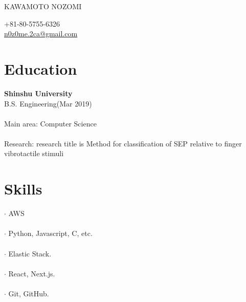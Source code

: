 \documentclass[11pt]{article} %
\begin{document}

\parbox[top][0.12\textheight][c]{\linewidth}{ %
	\vspace{-0.04\textheight} %
	{\color{name}\Huge KAWAMOTO NOZOMI}\\\medskip %
}

\begin{paracol}{2} %

{\faPhone} \hspace{1mm} +81-80-5755-6326 \\ %
{\small\faEnvelope} \hspace{1mm} \href{mailto:n0z0me.2ca@gmail.com}{\small n0z0me.2ca@gmail.com} \\ %

\vspace{1cm}

\section{\Large Education}
\textbf{\color{subtitle}\large Shinshu University}\\
B.S. Engineering(Mar 2019)\\
\\
Main area: Computer Science\\
\\
Research: research title is Method for classification of SEP relative to finger vibrotactile stimuli\\

\vspace{1cm}

\section{\Large Skills}
$\cdot$ AWS\\
\\
$\cdot$ Python, Javascript, C, etc.\\
\\
$\cdot$ Elastic Stack.\\
\\
$\cdot$ React, Next.js.\\
\\
$\cdot$ Git, GitHub.\\
\\


\end{paracol}
\end{document}
